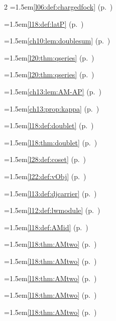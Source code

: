 \begin{multicols}{2}
\hangindent=1.5em\quad \ref{l06:def:chargedfock} (p.~\pageref{l06:def:chargedfock})\par
\hangindent=1.5em\quad \ref{l18:def:latP} (p.~\pageref{l18:def:latP})\par
\hangindent=1.5em\quad \ref{ch10:lem:doublesum} (p.~\pageref{ch10:lem:doublesum})\par
\hangindent=1.5em\quad \ref{l20:thm:qseries} (p.~\pageref{l20:thm:qseries})\par
\hangindent=1.5em\quad \ref{l20:thm:qseries} (p.~\pageref{l20:thm:qseries})\par
\hangindent=1.5em\quad \ref{ch13:lem:AM-AP} (p.~\pageref{ch13:lem:AM-AP})\par
\hangindent=1.5em\quad \ref{ch13:prop:kappa} (p.~\pageref{ch13:prop:kappa})\par
\hangindent=1.5em\quad \ref{l18:def:doublet} (p.~\pageref{l18:def:doublet})\par
\hangindent=1.5em\quad \ref{l18:thm:doublet} (p.~\pageref{l18:thm:doublet})\par
\hangindent=1.5em\quad \ref{l28:def:coset} (p.~\pageref{l28:def:coset})\par
\hangindent=1.5em\quad \ref{l22:def:vObj} (p.~\pageref{l22:def:vObj})\par
\hangindent=1.5em\quad \ref{l13:def:djcarrier} (p.~\pageref{l13:def:djcarrier})\par
\hangindent=1.5em\quad \ref{l12:def:lwmodule} (p.~\pageref{l12:def:lwmodule})\par
\hangindent=1.5em\quad \ref{l18:def:AMid} (p.~\pageref{l18:def:AMid})\par
\hangindent=1.5em\quad \ref{l18:thm:AMtwo} (p.~\pageref{l18:thm:AMtwo})\par
\hangindent=1.5em\quad \ref{l18:thm:AMtwo} (p.~\pageref{l18:thm:AMtwo})\par
\hangindent=1.5em\quad \ref{l18:thm:AMtwo} (p.~\pageref{l18:thm:AMtwo})\par
\hangindent=1.5em\quad \ref{l18:thm:AMtwo} (p.~\pageref{l18:thm:AMtwo})\par
\hangindent=1.5em\quad \ref{l18:thm:AMtwo} (p.~\pageref{l18:thm:AMtwo})\par

\end{multicols}

